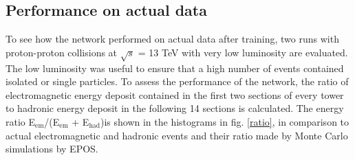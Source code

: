 \subsection{Performance on actual data}
To see how the network performed on actual data after training, two runs with proton-proton collisions at $\sqrt{s}$ = 13 TeV with very low luminosity are evaluated. The low luminosity was useful to ensure that a high number of events contained isolated or single particles. To assess the performance of the network, the ratio of electromagnetic energy deposit contained in the first two sections of every tower to hadronic energy deposit in the following 14 sections is calculated. The energy ratio E$_{\mathrm{em}}$/(E$_{\mathrm{em}}$ + E$_{\mathrm{had}}$)is shown in the histograms in fig. \ref{ratio}, in comparison to actual electromagnetic and hadronic events and their ratio made by Monte Carlo simulations by EPOS. 
